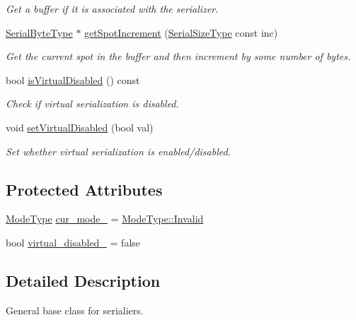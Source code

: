 \begin{DoxyCompactItemize}
\begin{DoxyCompactList}\small\item\em Get a buffer if it is associated with the serializer. \end{DoxyCompactList}\item 
\hyperlink{namespacecheckpoint_ae57f01cdc0b81776c23b6c7c934c58f5}{Serial\+Byte\+Type} $\ast$ \hyperlink{structcheckpoint_1_1_serializer_af2fc82901c31232b7549b20a8732de30}{get\+Spot\+Increment} (\hyperlink{namespacecheckpoint_a083f6674da3f94c2901b18c6d238217c}{Serial\+Size\+Type} const inc)
\begin{DoxyCompactList}\small\item\em Get the current spot in the buffer and then increment by some number of bytes. \end{DoxyCompactList}\item 
bool \hyperlink{structcheckpoint_1_1_serializer_af45e225cdb3a750a06de80a8cd5c6c37}{is\+Virtual\+Disabled} () const
\begin{DoxyCompactList}\small\item\em Check if virtual serialization is disabled. \end{DoxyCompactList}\item 
void \hyperlink{structcheckpoint_1_1_serializer_af57d7cd51e94dd44a5be184456c2d59f}{set\+Virtual\+Disabled} (bool val)
\begin{DoxyCompactList}\small\item\em Set whether virtual serialization is enabled/disabled. \end{DoxyCompactList}\end{DoxyCompactItemize}
\subsection*{Protected Attributes}
\begin{DoxyCompactItemize}
\item 
\hyperlink{namespacecheckpoint_ae2509499ccd8b1dc48fb535bf8aa3059}{Mode\+Type} \hyperlink{structcheckpoint_1_1_serializer_a89a1f207ad5ff75654cb6d48f432be37}{cur\+\_\+mode\+\_\+} = \hyperlink{namespacecheckpoint_ae2509499ccd8b1dc48fb535bf8aa3059a4bbb8f967da6d1a610596d7257179c2b}{Mode\+Type\+::\+Invalid}
\item 
bool \hyperlink{structcheckpoint_1_1_serializer_a46ef3c0da77d80853882a7cad641c2af}{virtual\+\_\+disabled\+\_\+} = false
\end{DoxyCompactItemize}


\subsection{Detailed Description}
General base class for serialiers. 

